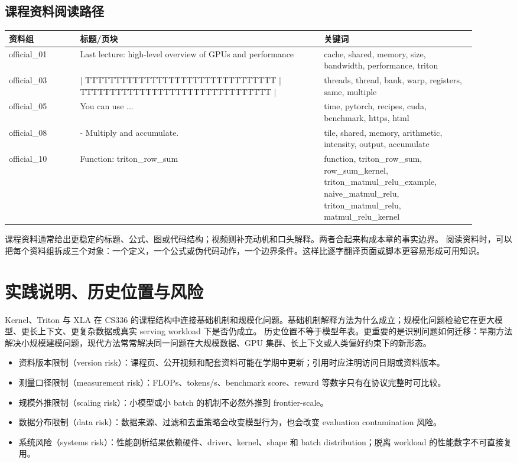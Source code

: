 \documentclass[a4paper]{article}
\begin{document}
\subsection{课程资料阅读路径}
\begin{longtable}{p{0.14\linewidth}p{0.48\linewidth}p{0.30\linewidth}}
\toprule
\textbf{资料组} & \textbf{标题/页块} & \textbf{关键词}\\
\midrule
official\_01 & Last lecture: high-level overview of GPUs and performance & cache, shared, memory, size, bandwidth, performance, triton\\
official\_03 & | TTTTTTTTTTTTTTTTTTTTTTTTTTTTTTTT | TTTTTTTTTTTTTTTTTTTTTTTTTTTTTTTT | & threads, thread, bank, warp, registers, same, multiple\\
official\_05 & You can use ... & time, pytorch, recipes, cuda, benchmark, https, html\\
official\_08 & - Multiply and accumulate. & tile, shared, memory, arithmetic, intensity, output, accumulate\\
official\_10 & Function: triton\_row\_sum & function, triton\_row\_sum, row\_sum\_kernel, triton\_matmul\_relu\_example, naive\_matmul\_relu, triton\_matmul\_relu, matmul\_relu\_kernel\\
\bottomrule
\end{longtable}
课程资料通常给出更稳定的标题、公式、图或代码结构；视频则补充动机和口头解释。两者合起来构成本章的事实边界。
阅读资料时，可以把每个资料组拆成三个对象：一个定义，一个公式或伪代码动作，一个边界条件。这样比逐字翻译页面或脚本更容易形成可用知识。
\section{实践说明、历史位置与风险}
Kernel、Triton 与 XLA 在 CS336 的课程结构中连接基础机制和规模化问题。基础机制解释方法为什么成立；规模化问题检验它在更大模型、更长上下文、更复杂数据或真实 serving workload 下是否仍成立。
历史位置不等于模型年表。更重要的是识别问题如何迁移：早期方法解决小规模建模问题，现代方法常常解决同一问题在大规模数据、GPU 集群、长上下文或人类偏好约束下的新形态。
\begin{itemize}
\item 资料版本限制（version risk）：课程页、公开视频和配套资料可能在学期中更新；引用时应注明访问日期或资料版本。
\item 测量口径限制（measurement risk）：FLOPs、tokens/s、benchmark score、reward 等数字只有在协议完整时可比较。
\item 规模外推限制（scaling risk）：小模型或小 batch 的机制不必然外推到 frontier-scale。
\item 数据分布限制（data risk）：数据来源、过滤和去重策略会改变模型行为，也会改变 evaluation contamination 风险。
\item 系统风险（systems risk）：性能剖析结果依赖硬件、driver、kernel、shape 和 batch distribution；脱离 workload 的性能数字不可直接复用。
\end{itemize}
\end{document}
